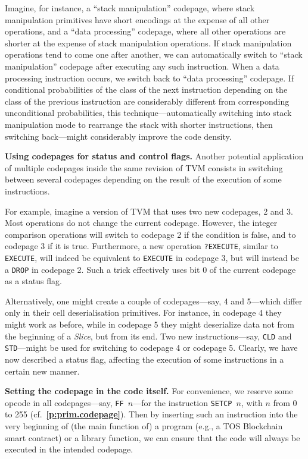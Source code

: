 \documentclass[12pt,oneside]{article}
\def\makepoint#1{\medbreak\noindent{\bf #1.\ }}
\def\nxsubpoint{\refstepcounter{subsubsection}%
  \smallbreak\makepoint{\thesubsubsection}}
\def\refpoint#1{{\rm\textbf{\ref{#1}}}}
\let\ptref=\refpoint
\def\emb#1{\textbf{#1.}}
\begin{document}
Imagine, for instance, a ``stack manipulation'' codepage, where stack manipulation primitives have short encodings at the expense of all other operations, and a ``data processing'' codepage, where all other operations are shorter at the expense of stack manipulation operations. If stack manipulation operations tend to come one after another, we can automatically switch to ``stack manipulation'' codepage after executing any such instruction. When a data processing instruction occurs, we switch back to ``data processing'' codepage. If conditional probabilities of the class of the next instruction depending on the class of the previous instruction are considerably different from corresponding unconditional probabilities, this technique---automatically switching into stack manipulation mode to rearrange the stack with shorter instructions, then switching back---might considerably improve the code density.

\nxsubpoint\emb{Using codepages for status and control flags}
Another potential application of multiple codepages inside the same revision of TVM consists in switching between several codepages depending on the result of the execution of some instructions.

For example, imagine a version of TVM that uses two new codepages, 2 and 3. Most operations do not change the current codepage. However, the integer comparison operations will switch to codepage 2 if the condition is false, and to codepage 3 if it is true. Furthermore, a new operation {\tt ?EXECUTE}, similar to {\tt EXECUTE}, will indeed be equivalent to {\tt EXECUTE} in codepage 3, but will instead be a {\tt DROP} in codepage 2. Such a trick effectively uses bit 0 of the current codepage as a status flag.

Alternatively, one might create a couple of codepages---say, 4 and 5---which differ only in their cell deserialisation primitives. For instance, in codepage 4 they might work as before, while in codepage 5 they might deserialize data not from the beginning of a {\em Slice}, but from its end. Two new instructions---say, {\tt CLD} and {\tt STD}---might be used for switching to codepage 4 or codepage 5. Clearly, we have now described a status flag, affecting the execution of some instructions in a certain new manner.

\nxsubpoint\emb{Setting the codepage in the code itself}\label{sp:setcp.opc}
For convenience, we reserve some opcode in all codepages---say, {\tt FF $n$}---for the instruction {\tt SETCP $n$}, with $n$ from 0 to 255 (cf.~\ptref{p:prim.codepage}). Then by inserting such an instruction into the very beginning of (the main function of) a program (e.g., a TOS Blockchain smart contract) or a library function, we can ensure that the code will always be executed in the intended codepage.
\end{document}
